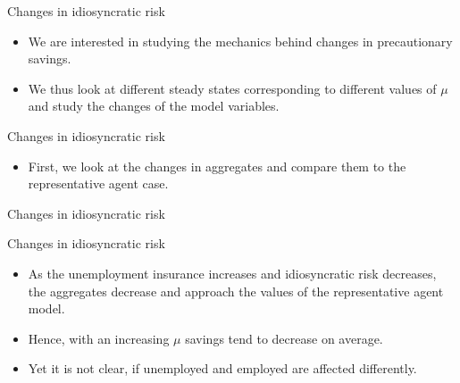 \documentclass{beamer}
\begin{document}
\begin{frame}{Changes in idiosyncratic risk}
	\begin{itemize}
	
	\item {
	We are interested in studying the mechanics behind changes in precautionary savings. 
	}
	\item {
	We thus look at different steady states corresponding to different values of $\mu$ and study the changes of the model variables.
	}
	
	\end{itemize}
\end{frame}

\begin{frame}{Changes in idiosyncratic risk}
	\begin{itemize}
	
	\item {
	First, we look at the changes in aggregates and compare them to the representative agent case.
	}

	\end{itemize}
\end{frame}

\begin{frame}{Changes in idiosyncratic risk}

\end{frame}
	
\begin{frame}{Changes in idiosyncratic risk}
	\begin{itemize}
	
	\item {
	As the unemployment insurance increases and idiosyncratic risk decreases, the aggregates decrease and approach the values of the representative agent model. 
	}

	\item {
Hence, with an increasing $\mu$ savings tend to decrease on average.
	}

	\item {
Yet it is not clear, if unemployed and employed are affected differently. 
	}	

	\end{itemize} 
\end{frame}
	
\end{document}
